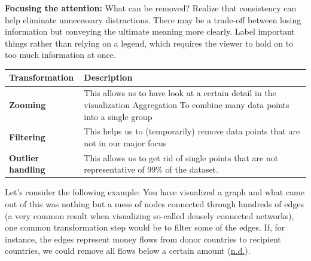 \documentclass[]{book}
\begin{document}
\textbf{Focusing the attention:}
What can be removed? Realize that consistency can help eliminate unnecessary distractions. There may be a trade-off between losing information but conveying the ultimate meaning more clearly. Label important things rather than relying on a legend, which requires the viewer to hold on to too much information at once.

\begin{longtable}[]{@{}ll@{}}
\toprule
\begin{minipage}[b]{0.15\columnwidth}\raggedright
\textbf{Transformation}\strut
\end{minipage} & \begin{minipage}[b]{0.79\columnwidth}\raggedright
\textbf{Description}\strut
\end{minipage}\tabularnewline
\midrule
\endhead
\begin{minipage}[t]{0.15\columnwidth}\raggedright
\textbf{Zooming}\strut
\end{minipage} & \begin{minipage}[t]{0.79\columnwidth}\raggedright
This allows us to have look at a certain detail in the visualization Aggregation To combine many data points into a single group\strut
\end{minipage}\tabularnewline
\begin{minipage}[t]{0.15\columnwidth}\raggedright
\textbf{Filtering}\strut
\end{minipage} & \begin{minipage}[t]{0.79\columnwidth}\raggedright
This helps us to (temporarily) remove data points that are not in our major focus\strut
\end{minipage}\tabularnewline
\begin{minipage}[t]{0.15\columnwidth}\raggedright
\textbf{Outlier handling}\strut
\end{minipage} & \begin{minipage}[t]{0.79\columnwidth}\raggedright
This allows us to get rid of single points that are not representative of 99\% of the dataset.\strut
\end{minipage}\tabularnewline
\bottomrule
\end{longtable}

Let's consider the following example: You have visualized a graph and what came out of this was nothing but a mess of nodes connected through hundreds of edges (a very common result when visualizing so-called densely connected networks), one common transformation step would be to filter some of the edges. If, for instance, the edges represent money flows from donor countries to recipient countries, we could remove all flows below a certain amount (\protect\hyperlink{ref-dataviz_bestprac}{n.d.}).
\end{document}
